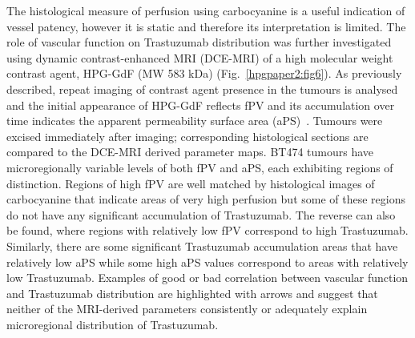 The histological measure of perfusion using carbocyanine is a useful indication of vessel patency, however it is static and therefore its interpretation is limited.
The role of vascular function on Trastuzumab distribution was further investigated using dynamic contrast-enhanced MRI (DCE-MRI) of a high molecular weight contrast agent, \acs{HPG-GdF} (MW 583 kDa) (Fig.~\ref{hpgpaper2:fig6}).
As previously described, repeat imaging of contrast agent presence in the tumours is analysed and the initial appearance of \acs{HPG-GdF} reflects \acs{fPV} and its accumulation over time indicates the apparent permeability surface area (aPS)~\cite{Baker:2015cob}.
Tumours were excised immediately after imaging; corresponding histological sections are compared to the DCE-MRI derived parameter maps.
\acs{BT474} tumours have microregionally variable levels of both \acs{fPV} and \acs{aPS}, each exhibiting regions of distinction.
Regions of high \acs{fPV} are well matched by histological images of carbocyanine that indicate areas of very high perfusion but some of these regions do not have any significant accumulation of Trastuzumab.
The reverse can also be found, where regions with relatively low \acs{fPV} correspond to high Trastuzumab.
Similarly, there are some significant Trastuzumab accumulation areas that have relatively low \acs{aPS} while some high \acs{aPS} values correspond to areas with relatively low Trastuzumab.
Examples of good or bad correlation between vascular function and Trastuzumab distribution are highlighted with arrows and suggest that neither of the MRI-derived parameters consistently or adequately explain microregional distribution of Trastuzumab.

